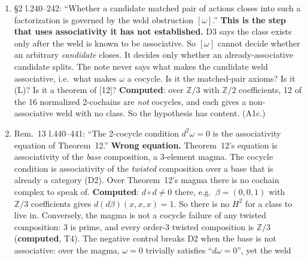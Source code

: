 \documentclass[11pt]{article}
\newcommand{\Z}{\mathbb{Z}}
\begin{document}
\begin{enumerate}[label=\textbf{D\arabic*},leftmargin=*]
Then the non-standard part.
\begin{itemize}[leftmargin=1.2em]
\item The phrase ``splits into its matched-pair factorization $C\bowtie D$'' identifies
\emph{split extension} with \emph{Zappa--Szép product}. A split extension $D\rtimes S$ is a
Zappa--Szép product in which one factor is normal and one action is trivial. A general matched pair
is not an extension at all. \textbf{Computed}: $S_4=S_3\cdot C_4$ is an exact factorization, and
neither factor is normal. So ``by Eilenberg--Mac Lane'' covers only the semidirect case. The rest is
[12]'s theorem, not EM's. (A-S1.)
\item ``splits'' is equated with (G), but your own [12] says splitting is $(L)\wedge(G)$. (A1b.)
\end{itemize}
\item \S2 l.240--242: ``Whether a candidate matched pair of actions closes into such a factorization
is governed by the weld obstruction $[\omega]$.'' \textbf{This is the step that uses associativity it has
not established.} D3 says the class exists only after the weld is known to be associative. So
$[\omega]$ cannot decide whether an arbitrary \emph{candidate} closes. It decides only whether an
already-associative candidate splits. The note never says what makes the candidate weld associative,
i.e.\ what makes $\omega$ a cocycle. Is it the matched-pair axioms? Is it (L)? Is it a theorem of [12]?
\textbf{Computed}: over $\Z/3$ with $\Z/2$ coefficients, 12 of the 16 normalized 2-cochains are
\emph{not} cocycles, and each gives a non-associative weld with no class. So the hypothesis has
content. (A1c.)
\item Rem.~13 l.440--441: ``The 2-cocycle condition $d^2\omega=0$ is the associativity equation of
Theorem~12.'' \textbf{Wrong equation.} Theorem~12's equation is associativity of the \emph{base}
composition, a 3-element magma. The cocycle condition is associativity of the \emph{twisted}
composition over a base that is already a category (D2). Over Theorem~12's magma there is no
cochain complex to speak of. \textbf{Computed}: $d\circ d\neq0$ there, e.g.\ $\beta=(0,0,1)$ with
$\Z/3$ coefficients gives $d(d\beta)(x,x,x)=1$. So there is no $H^2$ for a class to live in.
Conversely, the magma is not a cocycle failure of any twisted composition: 3 is prime, and every
order-3 twisted composition is $\Z/3$ (\textbf{computed}, T4). The negative control breaks D2 when the
base is not associative: over the magma, $\omega=0$ trivially satisfies ``$d\omega=0$'', yet the weld

\end{enumerate}
\end{document}
